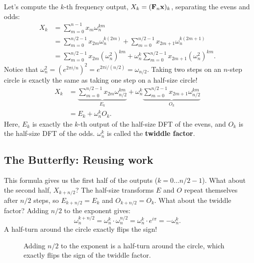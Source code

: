 Let's compute the $k$-th frequency output, $X_k = (\mathbf{F}_n \mathbf{x})_k$, separating the evens and odds:
\begin{align*}
  X_k &= \sum_{m=0}^{n-1} x_m \omega_n^{km} \\
      &= \sum_{m=0}^{n/2-1} x_{2m} \omega_n^{k(2m)} + \sum_{m=0}^{n/2-1} x_{2m+1} \omega_n^{k(2m+1)} \\
      &= \sum_{m=0}^{n/2-1} x_{2m} (\omega_n^2)^{km} + \omega_n^k \sum_{m=0}^{n/2-1} x_{2m+1} (\omega_n^2)^{km}.
\end{align*}
Notice that $\omega_n^2 = (e^{2\pi i/n})^2 = e^{2\pi i / (n/2)} = \omega_{n/2}$. Taking two steps on an $n$-step circle is exactly the same as taking one step on a half-size circle!
\begin{align*}
  X_k &= \underbrace{\sum_{m=0}^{n/2-1} x_{2m} \omega_{n/2}^{km}}_{E_k} + \omega_n^k \underbrace{\sum_{m=0}^{n/2-1} x_{2m+1} \omega_{n/2}^{km}}_{O_k} \\
      &= E_k + \omega_n^k O_k.
\end{align*}
Here, $E_k$ is exactly the $k$-th output of the half-size DFT of the evens, and $O_k$ is the half-size DFT of the odds. $\omega_n^k$ is called the \textbf{twiddle factor}.

\subsection{The Butterfly: Reusing work}

This formula gives us the first half of the outputs ($k = 0 \dots n/2-1$). What about the second half, $X_{k+n/2}$?
The half-size transforms $E$ and $O$ repeat themselves after $n/2$ steps, so $E_{k+n/2} = E_k$ and $O_{k+n/2} = O_k$.
What about the twiddle factor? Adding $n/2$ to the exponent gives:
\[
  \omega_n^{k+n/2} = \omega_n^k \cdot \omega_n^{n/2} = \omega_n^k \cdot e^{i\pi} = -\omega_n^k.
\]
A half-turn around the circle exactly flips the sign!

\begin{figure}[htbp]
\centering
{}
\caption{Adding $n/2$ to the exponent is a half-turn around the circle, which exactly flips the sign of the twiddle factor.}
\label{ch32:halfturn}
\end{figure}


